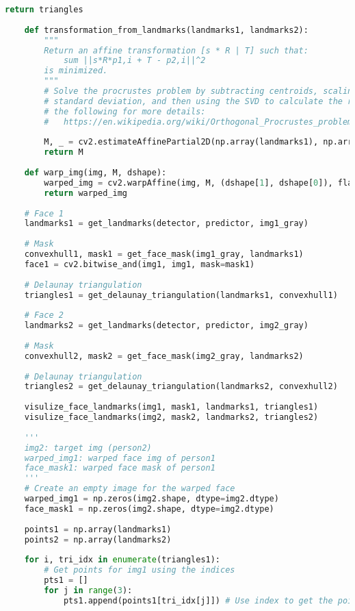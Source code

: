 \begin{lstlisting}[caption={student.py}, label={lst:code-example}, captionpos=t, language=python]
        return triangles
    
    def transformation_from_landmarks(landmarks1, landmarks2):
        """
        Return an affine transformation [s * R | T] such that:
            sum ||s*R*p1,i + T - p2,i||^2
        is minimized.
        """
        # Solve the procrustes problem by subtracting centroids, scaling by the
        # standard deviation, and then using the SVD to calculate the rotation. See
        # the following for more details:
        #   https://en.wikipedia.org/wiki/Orthogonal_Procrustes_problem
        
        M, _ = cv2.estimateAffinePartial2D(np.array(landmarks1), np.array(landmarks2))
        return M
    
    def warp_img(img, M, dshape):
        warped_img = cv2.warpAffine(img, M, (dshape[1], dshape[0]), flags=cv2.INTER_LINEAR, borderMode=cv2.BORDER_REFLECT_101)
        return warped_img
    
    # Face 1
    landmarks1 = get_landmarks(detector, predictor, img1_gray)
    
    # Mask
    convexhull1, mask1 = get_face_mask(img1_gray, landmarks1)
    face1 = cv2.bitwise_and(img1, img1, mask=mask1)
    
    # Delaunay triangulation
    triangles1 = get_delaunay_triangulation(landmarks1, convexhull1)
    
    # Face 2
    landmarks2 = get_landmarks(detector, predictor, img2_gray)
    
    # Mask
    convexhull2, mask2 = get_face_mask(img2_gray, landmarks2)
    
    # Delaunay triangulation
    triangles2 = get_delaunay_triangulation(landmarks2, convexhull2)
    
    visulize_face_landmarks(img1, mask1, landmarks1, triangles1)
    visulize_face_landmarks(img2, mask2, landmarks2, triangles2)
    
    '''
    img2: target img (person2)
    warped_img1: warped face img of person1
    face_mask1: warped face mask of person1
    '''
    # Create an empty image for the warped face
    warped_img1 = np.zeros(img2.shape, dtype=img2.dtype)
    face_mask1 = np.zeros(img2.shape, dtype=img2.dtype)
    
    points1 = np.array(landmarks1)
    points2 = np.array(landmarks2)
    
    for i, tri_idx in enumerate(triangles1):
        # Get points for img1 using the indices
        pts1 = []
        for j in range(3):
            pts1.append(points1[tri_idx[j]]) # Use index to get the point from landmarks1
    

\end{lstlisting}
